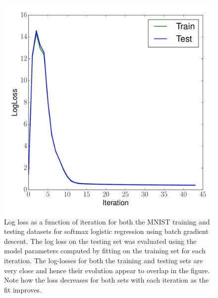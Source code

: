 \documentclass[12pt]{amsart}
\begin{document}
\begin{figure}[H]
	\includegraphics[width=\columnwidth]{bgd_mnist_multi_train_test_ll.pdf}
    \caption{Log loss as a function of iteration for both the MNIST training and testing datasets for softmax logistic regression using batch gradient descent.  The log loss on the testing set was evaluated using the model parameters computed by fitting on the training set for each iteration.  The log-losses for both the training and testing sets are very close and hence their evolution appear to overlap in the figure.  Note how the loss decreases for both sets with each iteration as the fit improves.}
    \label{fig:bgd_mnist_ll}
\end{figure}
\end{document}
